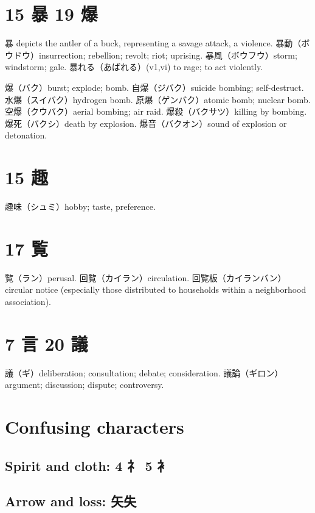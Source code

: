 \section{15 暴 19 爆}

暴 depicts the antler of a buck, representing a savage attack, a violence.
暴動（ボウドウ）insurrection; rebellion; revolt; riot; uprising.
暴風（ボウフウ）storm; windstorm; gale.
暴れる（あばれる）(v1,vi) to rage; to act violently.

爆（バク）burst; explode; bomb.
自爆（ジバク）suicide bombing; self-destruct.
水爆（スイバク）hydrogen bomb.
原爆（ゲンバク）atomic bomb; nuclear bomb.
空爆（クウバク）aerial bombing; air raid.
爆殺（バクサツ）killing by bombing.
爆死（バクシ）death by explosion.
爆音（バクオン）sound of explosion or detonation.

\section{15 趣}

趣味（シュミ）hobby; taste, preference.

\section{17 覧}

覧（ラン）perusal.
回覧（カイラン）circulation.
回覧板（カイランバン）circular notice
(especially those distributed to households within a neighborhood association).

\section{7 言 20 議}

議（ギ）deliberation; consultation; debate; consideration.
議論（ギロン）argument; discussion; dispute; controversy.

\section{Confusing characters}

\subsection{Spirit and cloth: 4 礻 5 衤}

\subsection{Arrow and loss: 矢失}

